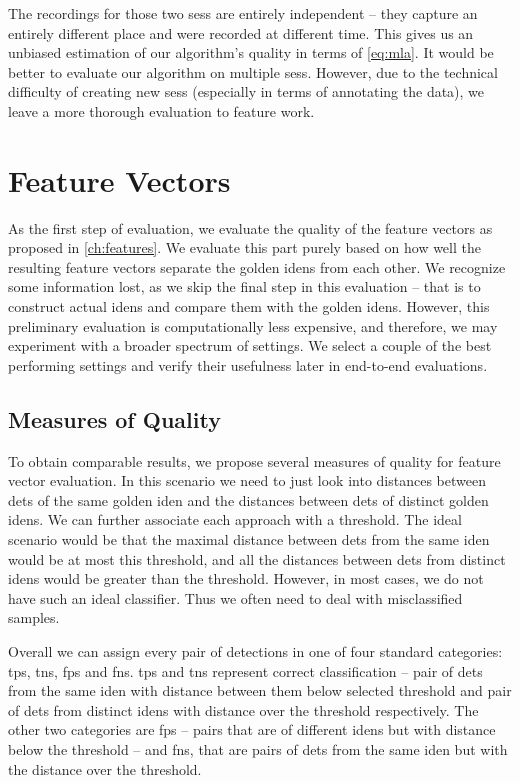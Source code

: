 The recordings for those two \glspl{ses} are entirely independent -- they
capture an entirely different place and were recorded at different time. This gives
us an unbiased estimation of our algorithm's quality in terms of
\autoref{eq:mla}. It would be better to evaluate our algorithm on multiple
\glspl{ses}. However, due to the technical difficulty of creating new \glspl{ses}
(especially in terms of annotating the data), we leave a more thorough evaluation
to feature work.

\section{Feature Vectors}

\label{sec:eval_fv}

As the first step of evaluation, we evaluate the
quality of the feature vectors as proposed in \autoref{ch:features}. We evaluate this part purely based on how well the resulting feature vectors
separate the golden \glspl{iden} from each other. We recognize some
information lost, as we skip the final step in this evaluation -- that is to
construct actual \glspl{iden} and compare them with the golden \glspl{iden}.
However, this preliminary evaluation is computationally less expensive, and
therefore, we may experiment with a broader spectrum of settings. We select a couple of the best performing settings and verify their usefulness later
in end-to-end evaluations.

\subsection{Measures of Quality}

To obtain comparable results, we propose several measures of quality for feature vector evaluation. In this scenario we need to just look into distances between \glspl{det} of the same golden \gls{iden} and the distances between \glspl{det} of distinct golden \glspl{iden}. We can further associate each approach with a threshold. The ideal scenario would be that the maximal distance between \glspl{det} from the same \gls{iden} would be at most this threshold, and all the distances between \glspl{det} from distinct \glspl{iden} would be greater than the threshold. However, in most cases, we do not have such an ideal classifier. Thus we often need to deal with misclassified samples.

Overall we can assign every pair of detections in one of four standard categories:  \glspl{tp}, \glspl{tn}, \glspl{fp} and \glspl{fn}. \glspl{tp} and \glspl{tn} represent correct classification -- pair of \glspl{det} from the same \gls{iden} with distance between them below selected threshold and pair of \glspl{det} from distinct \glspl{iden} with distance over the threshold respectively. The other two categories are \glspl{fp} -- pairs that are of different \glspl{iden} but with distance below the threshold -- and \glspl{fn}, that are pairs of \glspl{det} from the same \gls{iden} but with the distance over the threshold.

